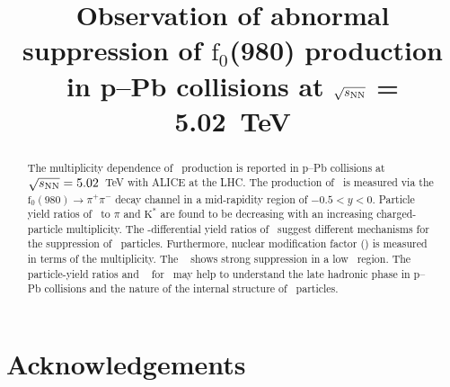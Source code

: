 \documentclass[ALICE,manyauthors]{cernphprep}
\begin{document}
\begin{titlepage}

\PHyear{}
\PHdate{\today}
%

\title{Observation of abnormal suppression of $\mathrm{f}_{0}$(980) production \\in p--Pb collisions at $\sqrt{s_{\rm NN}}$ = 5.02~TeV }

\ShortTitle{}   %


\begin{abstract}
The multiplicity dependence of \fzero\ production is reported in p--Pb collisions at $\sqrt{s_{\rm NN}} = 5.02$~TeV with ALICE at the LHC. The production of \fzero\ is measured via the $\mathrm{f}_0 (980) \rightarrow \pi^{+}\pi^{-}$ decay channel in a mid-rapidity region of $-0.5<y<0$. Particle yield ratios of \fzero\ to $\pi$ and $\mathrm{K}^{*}$ are found to be decreasing with an increasing charged-particle multiplicity. The \pT-differential yield ratios of \fzero\ suggest different mechanisms for the suppression of \fzero\ particles. Furthermore, nuclear modification factor (\qppb) is  measured in terms of the multiplicity. The \qppb~ shows strong suppression in a low \pT\ region. The particle-yield ratios and \qppb~ for \fzero\ may help to understand the late hadronic phase in p--Pb collisions and the nature of the internal structure of \fzero\ particles.



\color{black}

\end{abstract}
 
\end{titlepage}

\setcounter{page}{2}








\newenvironment{acknowledgement}{\relax}{\relax}
\begin{acknowledgement}
\section*{Acknowledgements}
\noindent 
\end{acknowledgement}

\newpage
\appendix



\clearpage




%     
\end{document}
